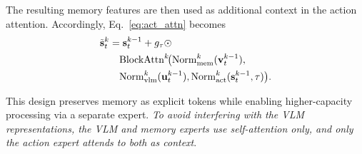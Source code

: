 The resulting memory features are then used as additional context in the action attention.
Accordingly, Eq.~\ref{eq:act_attn} becomes
\begin{align*}
\tilde{\mathbf{s}}_t^{k}
&=
\mathbf{s}_t^{k-1}
+
g_{\tau} \odot
\notag\\
&\quad
\mathrm{BlockAttn}^{k}\!\big(
\mathrm{Norm}^{k}_{\text{mem}}(\mathbf{v}_t^{k-1}),
\notag\\
&\quad
\mathrm{Norm}^{k}_{\text{vlm}}(\mathbf{u}_t^{k-1}),
\mathrm{Norm}^{k}_{\text{act}}(\mathbf{s}_t^{k-1}, \tau)
\big).
\end{align*}

This design preserves memory as explicit tokens while enabling higher-capacity processing via a separate expert.
\textit{To avoid interfering with the VLM representations, the VLM and memory experts use self-attention only, and only the action expert attends to both as context}.

